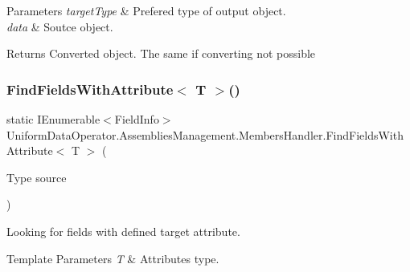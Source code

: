 \begin{DoxyParams}{Parameters}
{\em target\+Type} & Prefered type of output object.\\
\hline
{\em data} & Soutce object.\\
\hline
\end{DoxyParams}
\begin{DoxyReturn}{Returns}
Converted object. The same if converting not possible
\end{DoxyReturn}
\mbox{\label{class_uniform_data_operator_1_1_assemblies_management_1_1_members_handler_a563f793ce990d95b0830a3dff609a9ee}} 
\subsubsection{\texorpdfstring{Find\+Fields\+With\+Attribute$<$ T $>$()}{FindFieldsWithAttribute< T >()}}
{\footnotesize\ttfamily static I\+Enumerable$<$Field\+Info$>$ Uniform\+Data\+Operator.\+Assemblies\+Management.\+Members\+Handler.\+Find\+Fields\+With\+Attribute$<$ T $>$ (\begin{DoxyParamCaption}\item[{Type}]{source }\end{DoxyParamCaption})\hspace{0.3cm}{\ttfamily [static]}}



Looking for fields with defined target attribute. 


\begin{DoxyTemplParams}{Template Parameters}
{\em T} & Attribute\textquotesingle{}s type.\\
\hline
\end{DoxyTemplParams}

